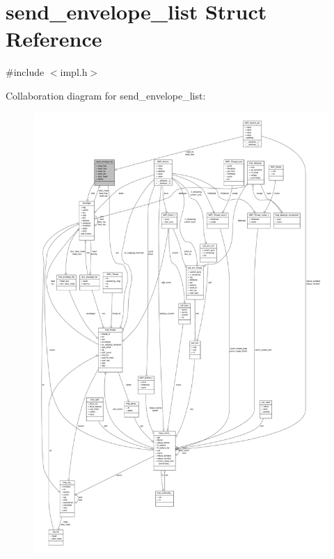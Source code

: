 \hypertarget{structsend__envelope__list}{\section{send\-\_\-envelope\-\_\-list \-Struct \-Reference}
\label{structsend__envelope__list}
}


{\ttfamily \#include $<$impl.\-h$>$}



\-Collaboration diagram for send\-\_\-envelope\-\_\-list\-:
\nopagebreak
\begin{figure}[H]
\begin{center}
\leavevmode
\includegraphics[width=350pt]{structsend__envelope__list__coll__graph}
\end{center}
\end{figure}
